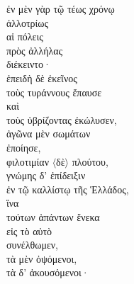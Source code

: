 {\large
\begin{greek}
\noindent ἐν μὲν γὰρ τῷ τέως χρόνῳ \\
ἀλλοτρίως \\
αἱ πόλεις \\
\tabto{2em} πρὸς ἀλλήλας \\
διέκειντο·\\
ἐπειδὴ δὲ ἐκεῖνος \\
τοὺς τυράννους ἔπαυσε\\
καὶ\\
τοὺς ὑβρίζοντας ἐκώλυσεν, \\
ἀγῶνα μὲν σωμάτων \\
ἐποίησε, \\
φιλοτιμίαν $\langle$δὲ$\rangle$ πλούτου, \\
γνώμης δ' ἐπίδειξιν \\
\tabto{2em} ἐν τῷ καλλίστῳ τῆς Ἑλλάδος,\\
ἵνα \\
\tabto{2em} τούτων ἁπάντων ἕνεκα \\
\tabto{2em} εἰς τὸ αὐτὸ \\
συνέλθωμεν, \\
\tabto{2em} τὰ μὲν ὀψόμενοι, \\
\tabto{2em} τὰ δ' ἀκουσόμενοι·\\

\end{greek}
}

